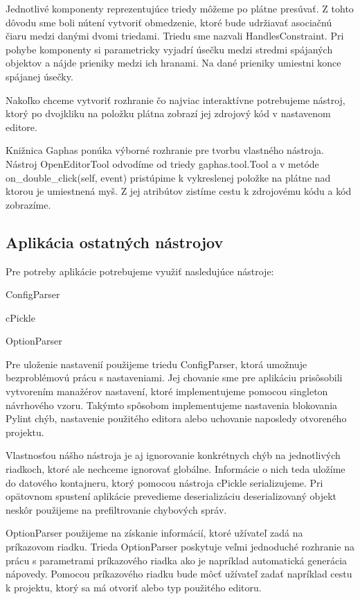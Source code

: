 \documentclass[11pt,oneside,final]{fithesis2}
\begin{document}
		Jednotlivé komponenty reprezentujúce triedy môžeme po plátne presúvať. Z tohto dôvodu sme boli nútení vytvoriť obmedzenie, ktoré bude udržiavať asociačnú čiaru medzi danými dvomi triedami. Triedu sme nazvali HandlesConstraint. Pri pohybe komponenty si parametricky vyjadrí úsečku medzi stredmi spájaných objektov a nájde prieniky medzi ich hranami. Na dané prieniky umiestni konce spájanej úsečky.
		
		Nakoľko chceme vytvoriť rozhranie čo najviac interaktívne potrebujeme nástroj, ktorý po dvojkliku na položku plátna zobrazí jej zdrojový kód v nastavenom editore.
		
		Knižnica Gaphas ponúka výborné rozhranie pre tvorbu vlastného nástroja. Nástroj OpenEditorTool odvodíme od triedy gaphas.tool.Tool a v metóde on\_double\_click(self, event) pristúpime k vykreslenej položke na plátne nad ktorou je umiestnená myš. Z jej atribútov zistíme cestu k zdrojovému kódu a kód zobrazíme.

		\subsection{Aplikácia ostatných nástrojov}
		
	Pre potreby aplikácie potrebujeme využiť nasledujúce nástroje:
	
				\begin{list}{•}{}
					\item ConfigParser
					\item cPickle
					\item OptionParser
    			\end{list}
	
	 Pre uloženie nastavenií použijeme triedu ConfigParser, ktorá umožnuje bezproblémovú prácu s nastaveniami. Jej chovanie sme pre aplikáciu prisôsobili vytvorením manažérov nastavení, ktoré implementujeme pomocou singleton návrhového vzoru. Takýmto spôsobom implementujeme nastavenia blokovania Pylint chýb, nastavenie použitého editora alebo uchovanie naposledy otvoreného projektu.
	
	Vlastnosťou nášho nástroja je aj ignorovanie konkrétnych chýb na jednotlivých riadkoch, ktoré ale nechceme ignorovať globálne. Informácie o nich teda uložíme do datového kontajneru, ktorý pomocou nástroja cPickle serializujeme. Pri opätovnom spustení aplikácie prevedieme deserializáciu deserializovaný objekt neskôr použijeme na prefiltrovanie chybových správ.
	
		OptionParser použijeme na získanie informácií, ktoré užívateľ zadá na príkazovom riadku.    Trieda OptionParser poskytuje veľmi jednoduché rozhranie na prácu s parametrami príkazového riadka ako je napríklad automatická generácia nápovedy. Pomocou príkazového riadku bude môcť užívateľ zadať napríklad cestu k projektu, ktorý sa má otvoriť alebo typ použitého editoru.
				
\end{document}
